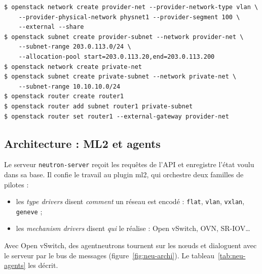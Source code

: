 \par\noindent\begin{minipage}{\linewidth}
\begin{lstlisting}[style=terminal]
$ openstack network create provider-net --provider-network-type vlan \
    --provider-physical-network physnet1 --provider-segment 100 \
    --external --share
$ openstack subnet create provider-subnet --network provider-net \
    --subnet-range 203.0.113.0/24 \
    --allocation-pool start=203.0.113.20,end=203.0.113.200
$ openstack network create private-net
$ openstack subnet create private-subnet --network private-net \
    --subnet-range 10.10.10.0/24
$ openstack router create router1
$ openstack router add subnet router1 private-subnet
$ openstack router set router1 --external-gateway provider-net
\end{lstlisting}
\end{minipage}\par

\subsection{Architecture : ML2 et agents}\label{sec:neu-archi}

Le serveur \texttt{neutron-server} reçoit les requêtes de l'API et enregistre l'état voulu dans sa base. Il confie le travail
au plugin \gls{ml2}, qui orchestre deux familles de pilotes \parencite{neutron-ml2} :

\begin{itemize}
  \item les \emph{type drivers} disent \emph{comment} un réseau est encodé : \texttt{flat}, \texttt{vlan}, \texttt{vxlan},
        \texttt{geneve} ;
  \item les \emph{mechanism drivers} disent \emph{qui} le réalise : Open vSwitch, OVN, SR-IOV\dots
\end{itemize}

Avec Open vSwitch, des \glspl{agentneutron} tournent sur les nœuds et dialoguent avec le serveur par le bus de messages
(figure~\ref{fig:neu-archi}). Le tableau~\ref{tab:neu-agents} les décrit.

